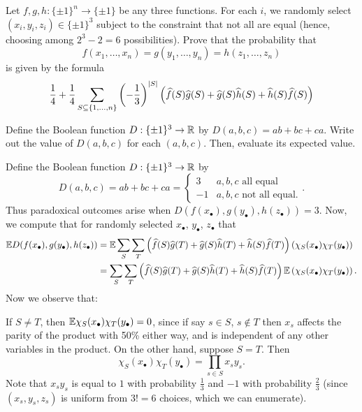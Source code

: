 \begin{problem}
	\gim
	\label{prob:arrow_lemma}
	Let $f,g,h \colon \{\pm1\}^n \to \{\pm1\}$
	be any three functions.
	For each $i$, we randomly select $(x_i, y_i, z_i) \in \{\pm1\}^3$
	subject to the constraint that not all are equal
	(hence, choosing among $2^3-2=6$ possibilities).
	Prove that the probability that
	\[ f(x_1, \dots, x_n) = g(y_1, \dots, y_n) = h(z_1, \dots, z_n) \]
	is given by the formula
	\[ \frac14 + \frac14 \sum_{S \subseteq \{1, \dots, n\}}
		\left( -\frac13 \right)^{\left\lvert S \right\rvert} 
		\left( \widehat f(S) \widehat g(S) + \widehat g(S) \widehat h(S) + \widehat h(S) \widehat f(S) \right)
		\]
	\begin{hint}
		Define the Boolean function $D : \{\pm 1\}^3 \to \mathbb R$ by
		$D(a,b,c) = ab+bc+ca$.
		Write out the value of $D(a,b,c)$ for each $(a,b,c)$.
		Then, evaluate its expected value.
	\end{hint}
	\begin{sol}
	Define the Boolean function $D : \{\pm 1\}^3 \to \mathbb R$ by
	\[ D(a,b,c) = ab + bc + ca
		= \begin{cases}
			3 & a,b,c \text{ all equal} \\
			-1 & a,b,c \text{ not all equal}.
		\end{cases}.
	\]
	Thus paradoxical outcomes arise when
	$D(f(x_\bullet), g(y_\bullet), h(z_\bullet)) = 3$.
	Now, we compute that for randomly selected
	$x_\bullet$, $y_\bullet$, $z_\bullet$ that
	\begin{align*}
		\mathbb E D(f(x_\bullet), g(y_\bullet), h(z_\bullet))
		&= \mathbb E \sum_S \sum_T
			\left( \widehat f(S) \widehat g(T) + \widehat g(S) \widehat h(T) + \widehat h(S) \widehat f(T) \right)
			\left( \chi_S(x_\bullet)\chi_T(y_\bullet) \right) \\
		&= \sum_S \sum_T
			\left( \widehat f(S) \widehat g(T) + \widehat g(S) \widehat h(T) + \widehat h(S) \widehat f(T) \right)
			\mathbb E\left( \chi_S(x_\bullet)\chi_T(y_\bullet) \right).
	\end{align*}
	Now we observe that:
	\begin{itemize}
		\ii If $S \neq T$, then $\mathbb E \chi_S(x_\bullet) \chi_T(y_\bullet) = 0$,
		since if say $s \in S$, $s \notin T$ then $x_s$ affects
		the parity of the product with 50\% either way,
		and is independent of any other variables in the product.
		\ii On the other hand, suppose $S = T$.
		Then 
		\[ \chi_S(x_\bullet) \chi_T(y_\bullet)
			= \prod_{s \in S} x_sy_s. \]
		Note that $x_sy_s$ is equal to $1$ with probability $\frac13$
		and $-1$ with probability $\frac23$
		(since $(x_s, y_s, z_s)$ is uniform from $3!=6$ choices,
		which we can enumerate).

\end{itemize}
\end{sol}
\end{problem}
